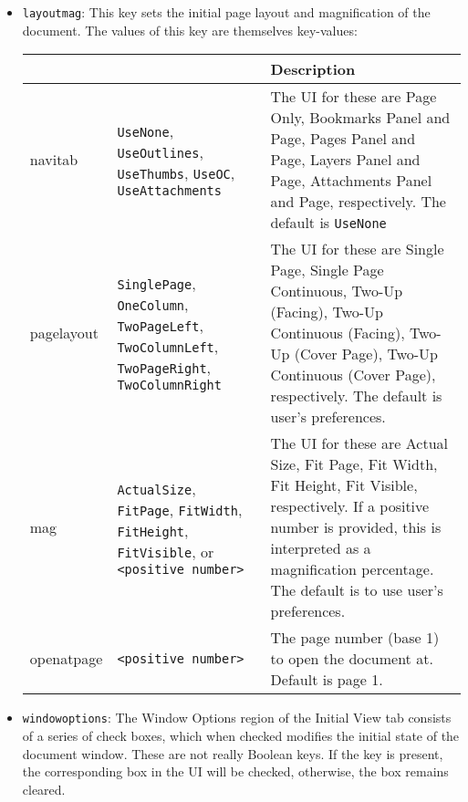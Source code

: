 \documentclass{article}
\begin{document}
\begin{itemize}

    \item \texttt{layoutmag}: This key sets the initial page layout and magnification
    of the document. The values of this key are themselves key-values:

    \begin{small}\setlength{\extrarowheight}{3pt}
    \begin{tabular}{|>{\ttfamily}l>{\raggedright}p{1.85in}p{2.15in}<{\raggedright}|}\hline
    \multicolumn{1}{|l}{Key}         &\multicolumn{1}{l}{Value(s)} & Description \\\hline
    navitab     & \texttt{UseNone}, \texttt{UseOutlines}, \texttt{UseThumbs},
                  \texttt{UseOC}, \texttt{UseAttachments}
                & The UI for these are Page Only, Bookmarks Panel
                  and Page, Pages Panel and Page, Layers Panel and
                  Page, Attachments Panel and Page, respectively. The
                  default is \texttt{UseNone}\\
    pagelayout  & \texttt{SinglePage}, \texttt{OneColumn}, \texttt{TwoPageLeft},
                  \texttt{TwoColumnLeft}, \texttt{TwoPageRight}, \texttt{TwoColumnRight}
                & The UI for these are Single Page, Single Page
                  Continuous, Two-Up (Facing), Two-Up Continuous
                  (Facing), Two-Up (Cover Page), Two-Up Continuous
                  (Cover Page), respectively. The default is user's
                  preferences.\\
    mag         & \texttt{ActualSize}, \texttt{FitPage}, \texttt{FitWidth},
                  \texttt{FitHeight}, \texttt{FitVisible}, or \texttt{<positive number>}
                & The UI for these are Actual Size, Fit Page, Fit
                  Width, Fit Height, Fit Visible, respectively. If a
                  positive number is provided, this is interpreted as
                  a magnification percentage. The default is to use
                  user's preferences.  \\
    openatpage  & \texttt{<positive number>}
                & The page number (base 1) to open the document at. Default is page 1.\\\hline
    \end{tabular}
    \end{small}%

\newpage

    \item \texttt{windowoptions}: The Window Options region of the
    Initial View tab consists of a series of check boxes, which when
    checked modifies the initial state of the document window. These are
    not really Boolean keys. If the key is present, the
    corresponding box in the UI will be checked, otherwise, the box
    remains cleared.


\end{itemize}
\end{document}
